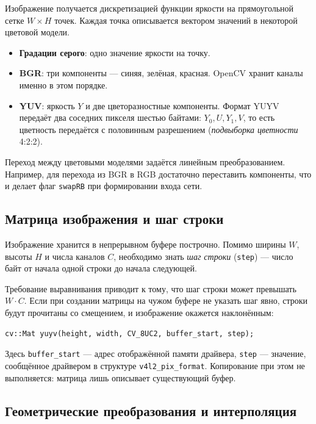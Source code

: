 \documentclass[11pt,a4paper]{article}
\theoremstyle{definition}
\theoremstyle{remark}
\begin{document}
Изображение получается дискретизацией функции яркости на прямоугольной сетке
$W \times H$ точек. Каждая точка описывается вектором значений в некоторой
цветовой модели.

\begin{itemize}
  \item \textbf{Градации серого}: одно значение яркости на точку.
  \item \textbf{BGR}: три компоненты --- синяя, зелёная, красная. OpenCV
        хранит каналы именно в этом порядке.
  \item \textbf{YUV}: яркость $Y$ и две цветоразностные компоненты. Формат
        YUYV передаёт два соседних пикселя шестью байтами: $Y_0, U, Y_1, V$,
        то есть цветность передаётся с половинным разрешением
        (\emph{подвыборка цветности} 4:2:2).
\end{itemize}

Переход между цветовыми моделями задаётся линейным преобразованием.
Например, для перехода из BGR в RGB достаточно переставить компоненты, что и
делает флаг \texttt{swapRB} при формировании входа сети.

\subsection{Матрица изображения и шаг строки}

Изображение хранится в непрерывном буфере построчно. Помимо ширины $W$,
высоты $H$ и числа каналов $C$, необходимо знать \emph{шаг строки}
(\texttt{step}) --- число байт от начала одной строки до начала следующей.

Требование выравнивания приводит к тому, что шаг строки может превышать
$W \cdot C$. Если при создании матрицы на чужом буфере не указать шаг явно,
строки будут прочитаны со смещением, и изображение окажется наклонённым:

\begin{lstlisting}
cv::Mat yuyv(height, width, CV_8UC2, buffer_start, step);
\end{lstlisting}

Здесь \texttt{buffer\_start} --- адрес отображённой памяти драйвера,
\texttt{step} --- значение, сообщённое драйвером в структуре
\texttt{v4l2\_pix\_format}. Копирование при этом не выполняется: матрица лишь
описывает существующий буфер.

\subsection{Геометрические преобразования и интерполяция}
\end{document}

